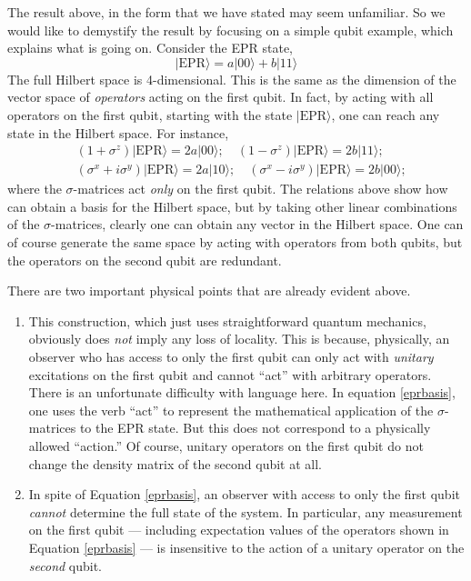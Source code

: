 \documentclass[12pt]{article}
\newcommand{\be}{\begin{equation}}
\newcommand{\ee}{\end{equation}}
\begin{document}
The result above, in the form that we have stated may seem unfamiliar. So we would like to demystify the result by focusing on a simple qubit example, which explains what is going on.
Consider the EPR state,
\be
|\text{EPR} \rangle = a |0 0 \rangle + b |1 1 \rangle
\ee
The full Hilbert space is 4-dimensional. This is the same as the dimension of the vector space of {\em operators} acting on the first qubit. In fact, by acting with all operators on the first qubit, starting with the state $|\text{EPR} \rangle$, one can reach any state in the Hilbert space. For instance,
\be
\label{eprbasis}
\begin{split}
&(1 + \sigma^{z}) |\text{EPR} \rangle = 2 a |0 0 \rangle; \quad (1 - \sigma^{z}) |\text{EPR} \rangle = 2 b |1 1 \rangle; \\
&(\sigma^x + i \sigma^y) |\text{EPR} \rangle = 2 a |1 0 \rangle; \quad (\sigma^x - i \sigma^y)  |\text{EPR} \rangle = 2 b |0 0 \rangle;
\end{split}
\ee
where the $\sigma$-matrices act {\em only} on the first qubit. The relations above show how can obtain a basis for the Hilbert space, but by taking other linear combinations of the $\sigma$-matrices, clearly one can obtain any vector in the Hilbert space. One can of course generate the same space by acting with operators from both qubits, but the operators on the second qubit are redundant.

There are two important physical points that are already evident above.
\begin{enumerate}
\item
This construction, which just uses straightforward quantum mechanics, obviously does {\em not} imply any loss of locality. This is because, physically, an observer who has access to only the first qubit can only act with {\em unitary} excitations on the first qubit and cannot ``act'' with arbitrary operators. There is an unfortunate difficulty with language here. In equation \eqref{eprbasis}, one uses the verb ``act'' to represent the mathematical application of the $\sigma$-matrices to the EPR state. But this does not correspond to a physically allowed ``action.'' Of course, unitary operators
on the first qubit do not change the density matrix of the second qubit at all.
\item
In spite of Equation \eqref{eprbasis}, an observer with access to only the first qubit {\em cannot} determine the full state of the system. In particular, any measurement on the first qubit --- including expectation values of the operators shown in Equation \eqref{eprbasis} --- is insensitive to the action of a unitary operator on the {\em second} qubit.
\end{enumerate}
\end{document}
